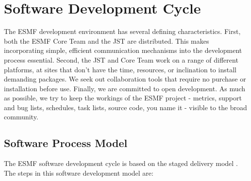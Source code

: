 
\section{Software Development Cycle}
\label{sec:life_cycle}

The ESMF development environment has several defining characteristics.
First, both the ESMF Core Team and the JST are distributed.  This makes
incorporating simple, efficient communication mechanisms into the
development process essential.  Second, the JST and Core Team work on
a range of different platforms, at sites that don't have the time, resources,
or inclination to install demanding packages.  We seek out collaboration
tools that require no purchase or installation before use.
Finally, we are committed to open development.  As much as possible, we
try to keep the workings of the ESMF project - metrics,
support and bug lists, schedules, task lists, source code, you name it -
visible to the broad community.

\subsection{Software Process Model}

The ESMF software development cycle is based on the staged 
delivery model \cite{mcconnell96}.  The steps in this software development
model are:

